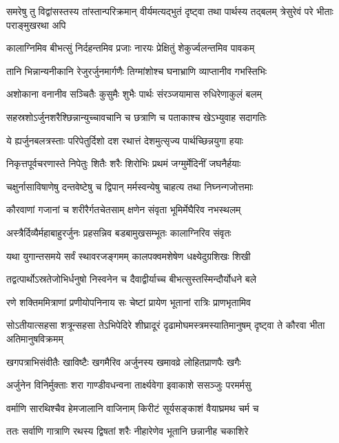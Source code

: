 \threelineshloka
{समरेषु तु विद्वांसस्तस्य तांस्तान्परिक्रमान्}
{वीर्यमत्यद्भुतं दृष्ट्वा तथा पार्थस्य तद्बलम्}
{त्रेसुरेवं परे भीताः पराङ्मुखरथा अपि}


\twolineshloka
{कालाग्निमिव बीभत्सुं निर्दहन्तमिव प्रजाः}
{नारयः प्रेक्षितुं शेकुर्ज्वलन्तमिव पावकम्}


\twolineshloka
{तानि भिन्नान्यनीकानि रेजुरर्जुनमार्गणैः}
{तिग्मांशोश्च घनाभ्राणि व्याप्तानीव गभस्तिभिः}


\twolineshloka
{अशोकाना वनानीव सञ्चितैः कुसुमैः शुभैः}
{पार्थः संरञ्जयामास रुधिरेणाकुलं बलम्}


\twolineshloka
{सहस्रशोऽर्जुनशरैश्छिन्नान्युच्चावचानि च}
{छत्राणि च पताकाश्च खेऽभ्युवाह सदागतिः}


\twolineshloka
{ये ह्यर्जुनबलत्रस्ताः परिपेतुर्दिशो दश}
{रथात्तं देशमुत्सृज्य पार्थच्छिन्नयुगा हयाः}


\twolineshloka
{निकृत्तपूर्वचरणास्ते निपेतुः शितैः शरैः}
{शिरोभिः प्रथमं जग्मुर्मेदिनीं जघनैर्हयाः}


\twolineshloka
{चक्षुर्नासाविषाणेषु दन्तवेष्टेषु च द्विपान्}
{मर्मस्वन्येषु चाहत्य तथा निघ्नन्गजोत्तमाः}


\twolineshloka
{कौरवाणां गजानां च शरीरैर्गतचेतसाम्}
{क्षणेन संवृता भूमिर्मेघैरिव नभस्थलम्}


\twolineshloka
{अस्त्रैर्दिव्यैर्महाबाहुरर्जुनः प्रहसन्निव}
{बडबामुखसम्भूतः कालाग्निरिव संवृतः}


\twolineshloka
{यथा युगान्तसमये सर्वं स्थावरजङ्गमम्}
{कालपक्वमशेषेण धक्ष्येदुग्रशिखः शिखी}


\twolineshloka
{तद्वत्पार्थोऽस्रतेजोभिर्धनुषो निस्वनेन च}
{दैवाद्वीर्याच्च बीभत्सुस्तस्मिन्दौर्योधने बले}


\twolineshloka
{रणे शक्तिममित्राणां प्रणीयोपनिनाय सः}
{चेष्टां प्रायेण भूतानां रात्रिः प्राणभृतामिव}


\threelineshloka
{सोऽतीयात्सहसा शत्रून्सहसा तेऽभिपेदिरे}
{शीघ्रादूरं दृढामोघमस्त्रमस्यातिमानुषम्}
{दृष्ट्वा ते कौरवा भीता अतिमानुषविक्रमम्}


\twolineshloka
{खगपत्राभिसंवीतैः खाविष्टैः खगमैरिव}
{अर्जुनस्य खमावव्रे लोहितप्राणपैः खगैः}


\twolineshloka
{अर्जुनेन विनिर्मुक्ताः शरा गाण्डीवधन्वना}
{तार्क्ष्यवेगा इवाकाशे ससञ्जुः परमर्मसु}


\twolineshloka
{वर्माणि सारथिश्चैव हेमजालानि वाजिनाम्}
{किरीटं सूर्यसङ्काशं वैयाघ्रमथ चर्म च}


\twolineshloka
{ततः सर्वाणि गात्राणि रथस्य द्विषतां शरैः}
{नीहारेणेव भूतानि छन्नानीह चकाशिरे}


